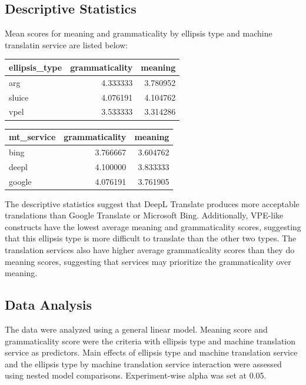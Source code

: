 \documentclass[
  man,floatsintext]{apa6}
\begin{document}
\hypertarget{descriptive-statistics}{%
\subsection{Descriptive Statistics}\label{descriptive-statistics}}

Mean scores for meaning and grammaticality by ellipsis type and machine translatin service are listed below:

\begin{tabular}{l|r|r}
\hline
ellipsis\_type & grammaticality & meaning\\
\hline
arg & 4.333333 & 3.780952\\
\hline
sluice & 4.076191 & 4.104762\\
\hline
vpel & 3.533333 & 3.314286\\
\hline
\end{tabular}

\begin{tabular}{l|r|r}
\hline
mt\_service & grammaticality & meaning\\
\hline
bing & 3.766667 & 3.604762\\
\hline
deepl & 4.100000 & 3.833333\\
\hline
google & 4.076191 & 3.761905\\
\hline
\end{tabular}

The descriptive statistics suggest that DeepL Translate produces more acceptable translations than Google Translate or Microsoft Bing. Additionally, VPE-like constructs have the lowest average meaning and grammaticality scores, suggesting that this ellipsis type is more difficult to translate than the other two types. The translation services also have higher average grammaticality scores than they do meaning scores, suggesting that services may prioritize the grammaticality over meaning.

\hypertarget{data-analysis}{%
\subsection{Data Analysis}\label{data-analysis}}

The data were analyzed using a general linear model. Meaning score and grammaticality score were the criteria with ellipsis type and machine translation service as predictors. Main effects of ellipsis type and machine translation service and the ellipsis type by machine translation service interaction were assessed using nested model comparisons. Experiment-wise alpha was set at 0.05.
\end{document}
